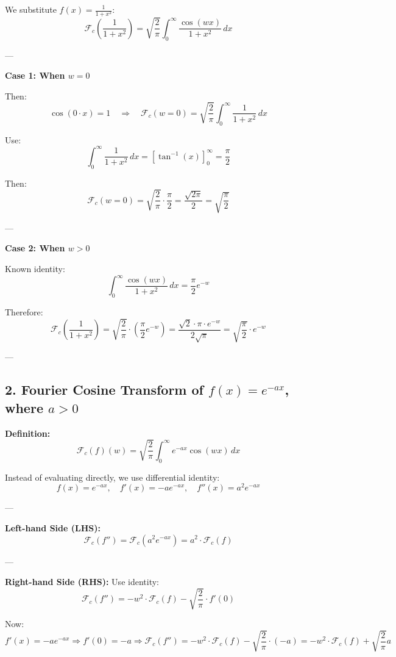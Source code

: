 \documentclass{article}
\begin{document}
We substitute \( f(x) = \frac{1}{1 + x^2} \):
\[
\mathcal{F}_c\left( \frac{1}{1 + x^2} \right) = \sqrt{\frac{2}{\pi}} \int_0^\infty \frac{\cos(wx)}{1 + x^2} \, dx
\]

---

\textbf{Case 1: When \( w = 0 \)}

Then:
\[
\cos(0 \cdot x) = 1 \quad \Rightarrow \quad \mathcal{F}_c(w = 0) = \sqrt{\frac{2}{\pi}} \int_0^\infty \frac{1}{1 + x^2} \, dx
\]

Use:
\[
\int_0^\infty \frac{1}{1 + x^2} \, dx = \left[ \tan^{-1}(x) \right]_0^\infty = \frac{\pi}{2}
\]

Then:
\[
\mathcal{F}_c(w = 0) = \sqrt{\frac{2}{\pi}} \cdot \frac{\pi}{2}
= \frac{\sqrt{2\pi}}{2}
= \boxed{ \sqrt{ \frac{\pi}{2} } }
\]

---

\textbf{Case 2: When \( w > 0 \)}

Known identity:
\[
\int_0^\infty \frac{\cos(wx)}{1 + x^2} \, dx = \frac{\pi}{2} e^{-w}
\]

Therefore:
\[
\mathcal{F}_c\left( \frac{1}{1 + x^2} \right)
= \sqrt{\frac{2}{\pi}} \cdot \left( \frac{\pi}{2} e^{-w} \right)
= \frac{\sqrt{2} \cdot \pi \cdot e^{-w}}{2\sqrt{\pi}}
= \boxed{ \sqrt{ \frac{\pi}{2} } \cdot e^{-w} }
\]

---

\subsection*{2. Fourier Cosine Transform of \( f(x) = e^{-a x} \), where \( a > 0 \)}

\textbf{Definition:}
\[
\mathcal{F}_c(f)(w) = \sqrt{\frac{2}{\pi}} \int_0^\infty e^{-a x} \cos(wx) \, dx
\]

Instead of evaluating directly, we use differential identity:
\[
f(x) = e^{-a x}, \quad f'(x) = -a e^{-a x}, \quad f''(x) = a^2 e^{-a x}
\]

---

\textbf{Left-hand Side (LHS):}
\[
\mathcal{F}_c(f'') = \mathcal{F}_c(a^2 e^{-a x}) = a^2 \cdot \mathcal{F}_c(f)
\]

---

\textbf{Right-hand Side (RHS):}
Use identity:
\[
\mathcal{F}_c(f'') = -w^2 \cdot \mathcal{F}_c(f) - \sqrt{ \frac{2}{\pi} } \cdot f'(0)
\]

Now:
\[
f'(x) = -a e^{-a x} \Rightarrow f'(0) = -a
\Rightarrow \mathcal{F}_c(f'') = -w^2 \cdot \mathcal{F}_c(f) - \sqrt{ \frac{2}{\pi} } \cdot (-a)
= -w^2 \cdot \mathcal{F}_c(f) + \sqrt{ \frac{2}{\pi} } a
\]
\end{document}

